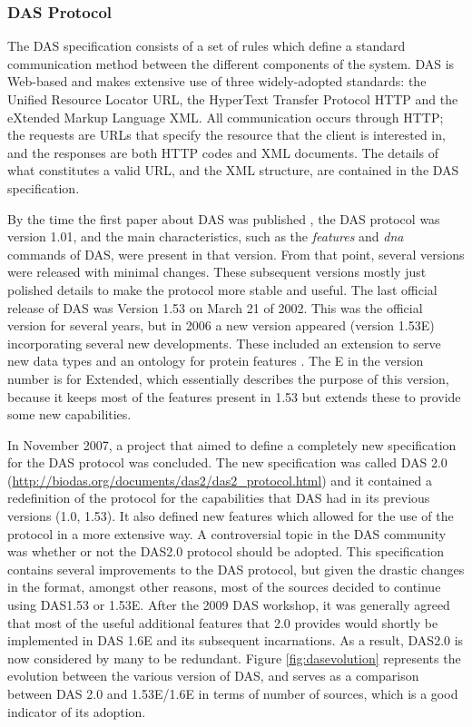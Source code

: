 \subsubsection{DAS Protocol}
\label{ssec:DASprotocol}
The DAS specification consists of a set of rules which define a standard communication method between the different components of the system. DAS is Web-based and makes extensive use of three widely-adopted standards: the Unified Resource Locator URL, the HyperText Transfer Protocol HTTP and the eXtended Markup Language XML. All communication occurs through HTTP; the requests are URLs that specify the resource that the client is interested in, and the responses are both HTTP codes and XML documents. The details of what constitutes a valid URL, and the XML structure, are contained in the DAS specification.

By the time the first paper about DAS was published \cite{DOW2001}, the DAS protocol was version 1.01, and the main characteristics, such as the \emph{features} and \emph{dna} commands of DAS, were present in that version. From that point, several versions were released with minimal changes. These subsequent versions mostly just polished details to make the protocol more stable and useful. The last official release of DAS was Version 1.53 on March 21 of 2002. This was the official version for several years, but in 2006 a new version appeared (version 1.53E) incorporating several new developments. These included an extension to serve new data types and an ontology for protein features \cite{JEN2008}. The E in the version number is for Extended, which essentially describes the purpose of this version, because it keeps most of the features present in 1.53 but extends these to provide some new capabilities.

In November 2007, a project that aimed to define a completely new specification for the DAS protocol was concluded. The new specification was called DAS 2.0 (\url{http://biodas.org/documents/das2/das2\_protocol.html}) and it contained a redefinition of the protocol for the capabilities that DAS had in its previous versions (1.0, 1.53). It also defined new features which allowed for the use of the protocol in a more extensive way. A controversial topic in the DAS community was whether or not the DAS2.0 protocol should be adopted. This specification contains several improvements to the DAS protocol, but given the drastic changes in the format, amongst other reasons, most of the sources decided to continue using DAS1.53 or 1.53E. After the 2009 DAS workshop, it was generally agreed that most of the useful additional features that 2.0 provides would shortly be implemented in DAS 1.6E and its subsequent incarnations. As a result, DAS2.0 is now considered by many to be redundant. Figure \ref{fig:dasevolution} represents the evolution between the various version of DAS, and serves as a comparison between DAS 2.0 and 1.53E/1.6E in terms of number of sources, which is a good indicator of its adoption.

